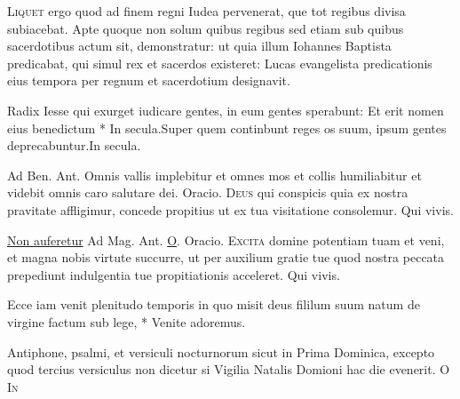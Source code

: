 \begin{multicols*}{2}
\begin{responsory}
\end{responsory}
\lettrine[lines=2]{\zallmancaps \color{Blue} L}{iquet} ergo quod ad finem regni Iudea pervenerat, que tot regibus divisa subiacebat. Apte quoque non solum quibus regibus sed etiam sub quibus sacerdotibus actum sit, demonstratur: ut quia illum Iohannes Baptista predicabat, qui simul rex et sacerdos existeret: Lucas evangelista predicationis eius tempora per regnum et sacerdotium designavit.
\begin{responsory-final}
{Radix Iesse qui exurget iudicare gentes, in eum gentes sperabunt: Et erit nomen eius benedictum * In secula.}{Super quem continbunt reges os suum, ipsum gentes deprecabuntur.}{In secula.}
\end{responsory-final}
{\color{Red} Ad Ben. Ant.} Omnis vallis implebitur et omnes mos et collis humiliabitur et videbit omnis caro salutare dei. {\color{Red} Oracio.}
\lettrine[lines=2]{\zallmancaps \color{Red} D}{eus} qui conspicis quia ex nostra pravitate affligimur, concede propitius ut ex tua visitatione consolemur. Qui vivis.
{\color{Red} }
\par {} \R \hyperlink{non-auferetur}{Non auferetur} {\color{Red} Ad Mag. Ant.} \hyperlink{o-antiphons}{O}. {\color{Red} Oracio.}
\lettrine[lines=2]{\zallmancaps \color{Blue} E}{xcita} domine potentiam tuam et veni, et magna nobis virtute succurre, ut per auxilium gratie tue quod nostra peccata prepediunt indulgentia tue propitiationis acceleret. Qui vivis.
\begin{invitatory}[]
{Ecce iam venit plenitudo temporis in quo misit deus fililum suum natum de virgine factum sub lege, * Venite adoremus.}
\end{invitatory}
Antiphone, psalmi, et versiculi nocturnorum sicut in Prima Dominica, excepto quod tercius versiculus non dicetur si Vigilia Natalis Domioni hac die evenerit.
\lettrine[lines=2]{\zallmancaps \color{Red} O}{}
\lettrine[lines=2]{\zallmancaps \color{Blue} I}{n}

\end{multicols*}
